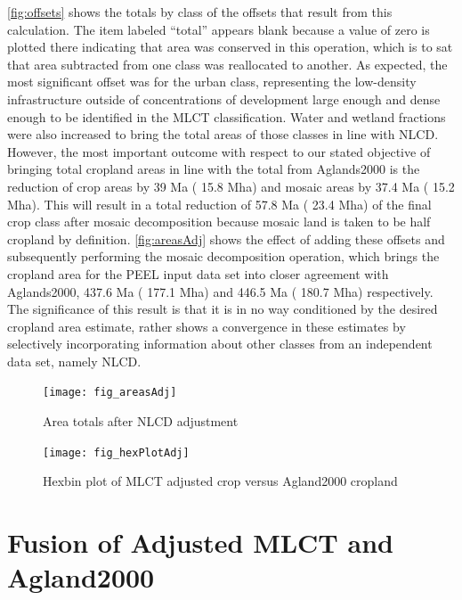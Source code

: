 \autoref{fig:offsets} shows the totals by class of the offsets that
result from this calculation.  The item labeled ``total'' appears
blank because a value of zero is plotted there indicating that area
was conserved in this operation, which is to sat that area subtracted
from one class was reallocated to another.  As expected, the most
significant offset was for the urban class, representing the
low-density infrastructure outside of concentrations of development
large enough and dense enough to be identified in the MLCT
classification.  Water and wetland fractions were also increased to
bring the total areas of those classes in line with NLCD.  However,
the most important outcome with respect to our stated objective of
bringing total cropland areas in line with the total from Aglands2000
is the reduction of crop areas by
39 Ma ( 15.8 Mha) and mosaic areas
by 37.4 Ma ( 15.2 Mha).  This will
result in a total reduction of
57.8 Ma ( 23.4 Mha)
of the final crop class after mosaic decomposition because mosaic land
is taken to be half cropland by definition.  \autoref{fig:areasAdj}
shows the effect of adding these offsets and subsequently performing
the mosaic decomposition operation, which brings the cropland area for
the PEEL input data set into closer agreement with Aglands2000,
437.6 Ma ( 177.1 Mha) and
446.5 Ma ( 180.7 Mha) respectively. The
significance of this result is that it is in no way conditioned by the
desired cropland area estimate, rather shows a convergence in these
estimates by selectively incorporating information about other classes
from an independent data set, namely NLCD.

\begin{figure}[ht]
  \centering


  \texttt{[image: fig\_areasAdj]}
  \caption{Area totals after NLCD adjustment}
  \label{fig:areasAdj}
\end{figure}


\begin{figure}[ht] 
  \centering

    \texttt{[image: fig\_hexPlotAdj]}
  \caption{Hexbin plot of MLCT adjusted crop versus Agland2000 cropland}
  \label{fig:hexPlotAdj} 
\end{figure} 


\section{Fusion of Adjusted MLCT and Agland2000}
\label{sec:fusion}



